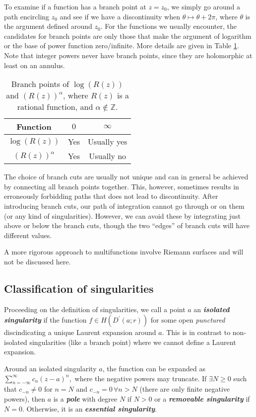 \documentclass{article}
\begin{document}
To examine if a function has a branch point at $z=z_0$, we simply go around a path encircling $z_0$ and see if we have a discontinuity when $\theta \mapsto \theta +2\pi $, where $\theta $ is the argument defined around $z_0$. For the functions we usually encounter, the candidates for branch points are only those that make the argument of logarithm or the base of power function zero/infinite. More details are given in Table \ref{tab:branch-points}. Note that integer powers never have branch points, since they are holomorphic at least on an annulus. 
\begin{table}[h]
    \centering
    \begin{tabular}{ccc}
        \toprule
            Function & $0$ &  $\infty $ \\
        \midrule
        $\log(R(z))$ & Yes  & Usually yes  \\
        $(R(z))^{\alpha }$     & Yes &  Usually no \\
        \bottomrule
    \end{tabular}
    \caption{Branch points of $\log(R(z))$ and $(R(z))^{\alpha}$, where $R(z)$ is a rational function, and $\alpha \notin \mathbb{Z}$. }
    \label{tab:branch-points}
\end{table}

The choice of branch cuts are usually not unique and can in general be achieved by connecting all branch points together. This, however, sometimes results in erroneously forbidding paths that does not lead to discontinuity.
After introducing branch cuts, our path of integration cannot go through or on them (or any kind of singularities). However, we can avoid these by integrating just above or below the branch cuts, though the two ``edges'' of branch cuts will have different values. 

A more rigorous approach to multifunctions involve Riemann surfaces and will not be discussed here. 
\subsection{Classification of singularities}
Proceeding on the definition of singularities, we call a point $a$ an \textit{\textbf{isolated singularity}} if the function $f \in H(D^\prime (a;r))$ for some open \textit{punctured} disc\textemdash indicating a unique Laurent expansion around $a$. This is in contrast to non-isolated singularities (like a branch point) where we cannot define a Laurent expansion. 

Around an isolated singularity $a$, the function can be expanded as
\(
    \sum_{n=-\infty }^{\infty} c_n (z-a)^n, 
\)
where the negative powers may truncate. If $\exists N \geq 0$ such that $c_{-n} \neq 0$ for $n=N$ and $c_{-n} = 0 \, \forall n>N$ (there are only finite negative powers), then $a$ is a \textit{\textbf{pole}}  with degree $N$ if $N > 0$ or a \textit{\textbf{removable singularity}} if $N=0$. Otherwise, it is an \textit{\textbf{essential singularity}}. 
\end{document}
